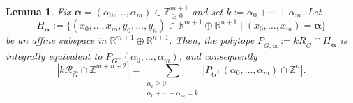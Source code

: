 \documentclass[10pt,a4paper]{amsart}
\newtheorem{lemma}{Lemma}
\newcommand{\R}{\mathbb{R}}
\newcommand{\Z}{\mathbb{Z}}
\newcommand{\vct}[1]{\boldsymbol{#1}}
\begin{document}
\begin{lemma}\label{lem:slicing-root-polytope}
Fix $\vct{\alpha}=(\alpha_0,\ldots,\alpha_m)\in\Z_{\ge0}^{m+1}$ and set $
k:=\alpha_0+\cdots+\alpha_m.$ Let 
\[H_{\vct{\alpha}} :=\{(x_0,\dots, x_m,y_0,\dots, y_n) \in \R^{m+1}\oplus \R^{n+1}\mid (x_0,\dots,x_m) = \vct{\alpha}\}\]
be an affine subspace in $\R^{m+1}\oplus \R^{n+1}.$
Then, the polytope $P_{\widehat G,\vct{\alpha}}:=kR_{\widehat G}\cap H_{\vct{\alpha}}$ is integrally equivalent to $P_{G^+}(\alpha_0,\dots, \alpha_m)$, and consequently
\begin{equation}
|k\mathcal R_{\widehat G}\cap\Z^{m+n+2}|
=\sum_{\substack{\alpha_i\ge0\\\alpha_0+\cdots+\alpha_m=k}}
|P_{G^+}(\alpha_0,\ldots,\alpha_m)\cap\Z^n|.
\label{eq:slicing}
\end{equation}
\end{lemma}
\end{document}
